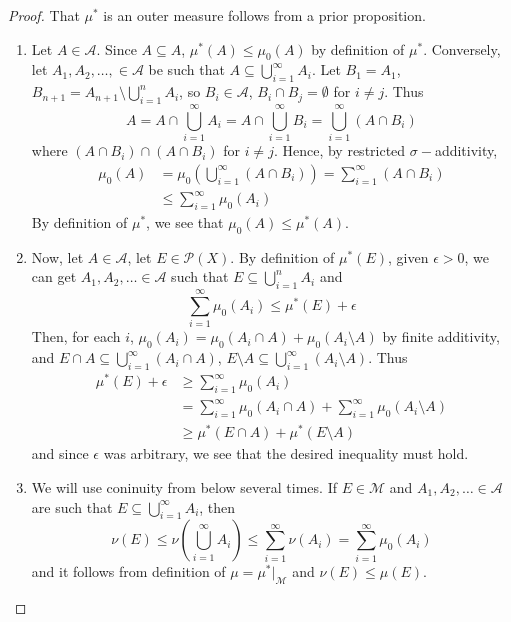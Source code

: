 \documentclass[11pt, a4paper]{memoir}
\theoremstyle{change}
\theoremstyle{plain}
\theoremstyle{nonumberplain}
\newtheorem{proof}{Proof}
\begin{document}
\begin{proof}
    That $\mu^*$ is an outer measure follows from a prior proposition.
    \begin{enumerate}[label=(\roman*)]
        \item Let $A\in\mathcal{A}$.
            Since $A\subseteq A$, $\mu^*(A)\leq\mu_0(A)$ by definition of $\mu^*$.
            Conversely, let $A_1,A_2,\ldots,\in\mathcal{A}$ be such that $A\subseteq\bigcup_{i=1}^\infty A_i$.
            Let $B_1=A_1$, $B_{n+1}=A_{n+1}\setminus\bigcup_{i=1}^n A_i$, so $B_i\in\mathcal{A}$, $B_i\cap B_j=\emptyset$ for $i\neq j$.
            Thus
            \begin{equation*}
                A=A\cap\bigcup_{i=1}^\infty A_i=A\cap\bigcup_{i=1}^\infty B_i=\bigcup_{i=1}^\infty(A\cap B_i)
            \end{equation*}
            where $(A\cap B_i)\cap(A\cap B_i)$ for $i\neq j$.
            Hence, by restricted $\sigma-$additivity,
            \begin{align*}
                \mu_0(A) &= \mu_0\left(\bigcup_{i=1}^\infty(A\cap B_i)\right)=\sum\limits_{i=1}^\infty(A\cap B_i)\\
                         &\leq\sum\limits_{i=1}^\infty\mu_0(A_i)
            \end{align*}
            By definition of $\mu^*$, we see that $\mu_0(A)\leq\mu^*(A)$.
        \item Now, let $A\in\mathcal{A}$, let $E\in\mathcal{P}(X)$.
            By definition of $\mu^*(E)$, given $\epsilon>0$, we can get $A_1,A_2,\ldots\in\mathcal{A}$ such that $E\subseteq\bigcup_{i=1}^n A_i$ and
            \begin{equation*}
                \sum\limits_{i=1}^\infty \mu_0(A_i)\leq\mu^*(E)+\epsilon
            \end{equation*}
            Then, for each $i$, $\mu_0(A_i)=\mu_0(A_i\cap A)+\mu_0(A_i\setminus A)$ by finite additivity, and $E\cap A\subseteq\bigcup_{i=1}^\infty(A_i\cap A)$, $E\setminus A\subseteq\bigcup_{i=1}^\infty(A_i\setminus A)$.
            Thus
            \begin{align*}
                \mu^*(E)+\epsilon &\geq\sum\limits_{i=1}^\infty\mu_0(A_i)\\
                                  &= \sum\limits_{i=1}^\infty \mu_0(A_i\cap A)+\sum\limits_{i=1}^\infty \mu_0(A_i\setminus A)\\
                                  &\geq \mu^*(E\cap A)+\mu^*(E\setminus A)
            \end{align*}
            and since $\epsilon$ was arbitrary, we see that the desired inequality must hold.
        \item We will use coninuity from below several times.
            If $E\in\mathcal{M}$ and $A_1,A_2,\ldots\in\mathcal{A}$ are such that $E\subseteq\bigcup_{i=1}^\infty A_i$, then
            \begin{equation*}
                \nu(E)\leq\nu\left(\bigcup_{i=1}^\infty A_i\right)\leq\sum\limits_{i=1}^\infty \nu(A_i)=\sum\limits_{i=1}^\infty \mu_0(A_i)
            \end{equation*}
            and it follows from definition of $\mu=\mu^*|_{\mathcal{M}}$ and $\nu(E)\leq\mu(E)$.


\end{enumerate}
\end{proof}
\end{document}
